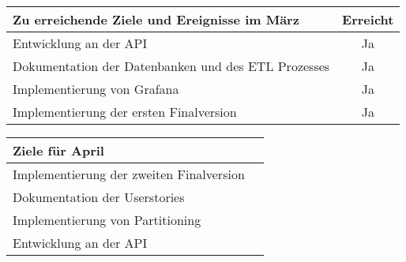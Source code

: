 \begin{tabularx}{\textwidth}{Xc}
    \arrayrulecolor{OliveGreen}
    \toprule
    {\bfseries Zu erreichende Ziele und Ereignisse im März} & {\bfseries Erreicht} \\
    \midrule[2pt]
    Entwicklung an der API      &Ja                    \\
    \rowcolor{OliveGreen!15}
    Dokumentation der Datenbanken und des ETL Prozesses                             &Ja                    \\
    \rowcolor{White}
    Implementierung von Grafana        &Ja                    \\
    \rowcolor{OliveGreen!15}
    Implementierung der ersten Finalversion                            &Ja                    \\
    \bottomrule[2pt]
\end{tabularx}
%
\vspace{1cm}
%
\begin{tabularx}{\textwidth}{Xc}
    \arrayrulecolor{OliveGreen}
    \toprule
    {\bfseries Ziele für April}                         &                      \\
    \midrule[2pt]
    Implementierung der zweiten Finalversion &                      \\
    \rowcolor{OliveGreen!15}
    Dokumentation der Userstories  &                      \\
    \rowcolor{White}
    Implementierung von Partitioning                     &                      \\
    \rowcolor{OliveGreen!15}
    Entwicklung an der API             &                      \\
\end{tabularx}
